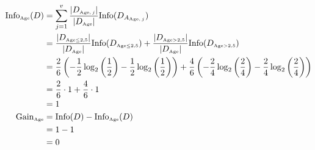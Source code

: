 \documentclass[
english,
smallborders
]{i6prcsht}
\newcommand{\OfSpecificValue}[3]{_{\text{\tiny #1#2#3}}}
\newcommand{\OfAttribute}[1]{_{\text{\tiny #1}}}
\begin{document}
\begin{solution}
\begin{enumerate}
\begin{enumerate}
\begin{enumerate}
\begin{enumerate}
					                        \begin{alignat*}{2}
						                        \text{Info}\OfAttribute{Age}(D) & = \sum_{j=1}^v \frac{|D\OfAttribute{Age$,j$}|}{|D\OfAttribute{Age}|} \text{Info}(D_{A\OfAttribute{Age$,j$}})                                                                                                                            \\
						                                                        & = \frac{|D\OfSpecificValue{Age}{$\leq$}{2,5}|}{|D\OfAttribute{Age}|} \text{Info}(D\OfSpecificValue{Age}{$\leq$}{2,5}) + \frac{|D\OfSpecificValue{Age}{$>$}{2,5}|}{|D\OfAttribute{Age}|} \text{Info}(D\OfSpecificValue{Age}{$>$}{2,5})   \\
						                                                        & = \frac{2}{6} \left(-\frac{1}{2} \log_2\left(\frac{1}{2}\right) - \frac{1}{2} \log_2\left(\frac{1}{2}\right)\right) + \frac{4}{6} \left(-\frac{2}{4} \log_2\left(\frac{2}{4}\right) - \frac{2}{4} \log_2\left(\frac{2}{4}\right)\right) \\
						                                                        & = \frac{2}{6} \cdot 1 + \frac{4}{6} \cdot 1                                                                                                                                                                                             \\
						                                                        & = 1                                                                                                                                                                                                                                     \\
						                        \text{Gain}\OfAttribute{Age}    & = \text{Info}(D) - \text{Info}\OfAttribute{Age}(D)                                                                                                                                                                                      \\
						                                                        & = 1 - 1                                                                                                                                                                                                                                 \\
						                                                        & = 0                                                                                                                                                                                                                                     \\
					                        \end{alignat*}
					                        

\end{enumerate}
\end{enumerate}
\end{enumerate}
\end{enumerate}
\end{solution}
\end{document}

